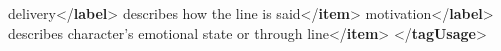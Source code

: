 \begin{shaded}
\hspace*{1em}delivery{</\textbf{label}>}\mbox{}\newline 
\hspace*{1em}describes how the line is said{</\textbf{item}>}\mbox{}\newline 
\hspace*{1em}motivation{</\textbf{label}>}\mbox{}\newline 
\hspace*{1em}describes character's emotional state or through line{</\textbf{item}>}\mbox{}\newline 
{}\mbox{}\newline 
{</\textbf{tagUsage}>}\end{shaded}\egroup\par \par
